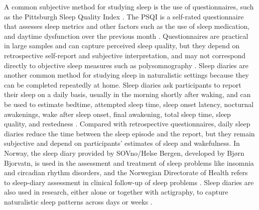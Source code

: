 \documentclass[12pt,a4paper]{report}
\begin{document}
A common subjective method for studying sleep is the use of questionnaires, such as the Pittsburgh Sleep Quality Index \parencite{buysse1989psqi}. The PSQI is a self-rated questionnaire that assesses sleep metrics and other factors such as the use of sleep medication, and daytime dysfunction over the previous month \parencite{sexton2014sleepatrophy}. Questionnaires are practical in large samples and can capture perceived sleep quality, but they depend on retrospective self-report and subjective interpretation, and may not correspond directly to objective sleep measures such as polysomnography \parencite{sexton2014sleepatrophy, tai2022sleepef}.
Sleep diaries are another common method for studying sleep in naturalistic settings because they can be completed repeatedly at home. Sleep diaries ask participants to report their sleep on a daily basis, usually in the morning shortly after waking, and can be used to estimate bedtime, attempted sleep time, sleep onset latency, nocturnal awakenings, wake after sleep onset, final awakening, total sleep time, sleep quality, and restedness \parencite{carney2012consensus}. Compared with retrospective questionnaires, daily sleep diaries reduce the time between the sleep episode and the report, but they remain subjective and depend on participants’ estimates of sleep and wakefulness. In Norway, the sleep diary provided by SOVno/Helse Bergen, developed by Bjørn Bjorvatn, is used in the assessment and treatment of sleep problems like insomnia and circadian rhythm disorders, and the Norwegian Directorate of Health refers to sleep-diary assessment in clinical follow-up of sleep problems \parencite{bjorvatn2025sovndagbok, helsedirektoratet2018sovnvansker}. Sleep diaries are also used in research, either alone or together with actigraphy, to capture naturalistic sleep patterns across days or weeks \parencite{liset2021sleep, marthinsen2024sleep}.
\end{document}

